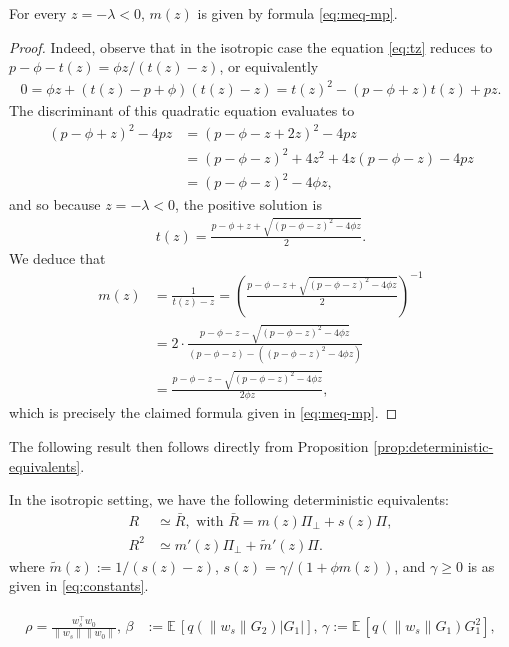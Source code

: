 \begin{lemma}
For every $z=-\lambda<0$, $m(z)$ is given by formula \eqref{eq:meq-mp}.
\label{lm:mp}
\end{lemma}
\begin{proof}
Indeed, observe that in the isotropic case the equation \eqref{eq:tz} reduces to $p-\phi-t(z) = \phi z / (t(z)-z)$, or equivalently
\begin{eqnarray*}
    0 = \phi z + (t(z)-p+\phi)(t(z)-z) = t(z)^2-(p-\phi+z)t(z) + pz.
\end{eqnarray*}
The discriminant of this quadratic equation evaluates to
\begin{align*}
(p-\phi+z)^2 -4pz &= (p-\phi-z + 2z)^2 - 4pz\\
&= (p-\phi-z)^2+4z^2+4z(p-\phi-z) - 4pz\\
&= (p-\phi-z)^2-4\phi z,
\end{align*}
and so because $z=-\lambda<0$, the positive solution is
\begin{eqnarray}
    t(z) = \frac{p-\phi + z + \sqrt{(p-\phi-z)^2 - 4\phi z}}{2}.
\end{eqnarray}
We deduce that
\begin{align*}
    m(z) &= \frac{1}{t(z)-z} = \left(\frac{p-\phi - z + \sqrt{(p-\phi-z)^2 - 4\phi z}}{2}\right)^{-1}\\
    &=2 \cdot \frac{p-\phi-z-\sqrt{(p-\phi-z)^2-4\phi z}}{(p-\phi-z)-((p-\phi-z)^2-4\phi z)}\\
    &= \frac{p-\phi-z-\sqrt{(p-\phi-z)^2-4\phi z}}{2\phi z},
\end{align*}
which is precisely the claimed formula given in \eqref{eq:meq-mp}.
\end{proof}


The following result then follows directly from Proposition \ref{prop:deterministic-equivalents}.
\begin{corollary}
In the isotropic setting, we have the following deterministic equivalents:
\begin{align}
R &\simeq \bar R,\text{ with }\bar R = m(z)\Pi_\perp +s(z) \Pi,\\
R^2 &\simeq m'(z)\Pi_\perp +  \tilde m'(z)\Pi.
\end{align}
where $\tilde m(z) := 1/(s(z)-z)$, $s(z) = \gamma/(1+\phi m(z))$, and $\gamma \ge 0$ is as given in \eqref{eq:constants}.

\label{corr:deterministic-equivalents-isotropic}
\end{corollary}

\begin{eqnarray}
    \begin{split}
\rho = \frac{w_s^\top w_0}{\|w_s\|\|w_0\|},\,
\beta &:= \mathbb E\,[q(\|w_s\| G_2)|G_1|],\,
\gamma := \mathbb E\,[q(\|w_s\|G_1)G_1^2],
    \end{split}
\label{eq:constants}
\end{eqnarray}

